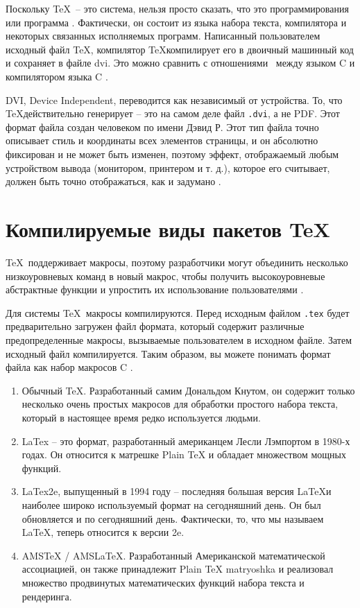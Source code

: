 Поскольку \TeX  \verb| |-- это система, нельзя просто сказать, что это  программирования\guillemotright \verb| | или \guillemotleft программа \guillemotright. Фактически, он состоит из языка набора текста, компилятора и некоторых связанных исполняемых программ. Написанный пользователем исходный файл \TeX, компилятор \TeX компилирует его в двоичный машинный код и сохраняет в файле dvi. Это можно сравнить с отношениями \  между языком C и компилятором языка C \cite{20}.

DVI, Device Independent, переводится как независимый от устройства. То, что \TeX действительно генерирует -- это на самом деле файл \verb|.dvi|, а не PDF. Этот формат файла создан человеком по имени Дэвид Р. Этот тип файла точно описывает стиль и координаты всех элементов страницы, и он абсолютно фиксирован и не может быть изменен, поэтому эффект, отображаемый любым устройством вывода (монитором, принтером и т. д.), которое его считывает, должен быть точно отображаться, как и задумано \cite{17}.

\section{Компилируемые виды пакетов \TeX}

\TeX \verb| |поддерживает макросы, поэтому разработчики могут объединить несколько низкоуровневых команд в новый макрос, чтобы получить высокоуровневые абстрактные функции и упростить их использование пользователями \cite{23}.

Для системы \TeX \verb| |макросы компилируются. Перед исходным файлом \verb|.tex| будет предварительно загружен файл формата, который содержит различные предопределенные макросы, вызываемые пользователем в исходном файле. Затем исходный файл компилируется. Таким образом, вы можете понимать формат файла как набор макросов C \cite{21}.

\begin{enumerate}
    \item  Обычный \TeX. Разработанный самим Дональдом Кнутом, он содержит только несколько очень простых макросов для обработки простого набора текста, который в настоящее время редко используется людьми.
    
    \item LaTex -- это формат, разработанный американцем Лесли Лэмпортом в 1980-х годах. Он относится к матрешке Plain TeX и обладает множеством мощных функций.
    
    \item LaTex2e, выпущенный в 1994 году -- последняя большая версия \LaTeX и наиболее широко используемый формат на сегодняшний день. Он был обновляется и по сегодняшний день. Фактически, то, что мы называем \guillemotleft LaTeX\guillemotright, теперь относится к версии 2e.
    
    \item AMSTeX / AMSLaTeX. Разработанный Американской математической ассоциацией, он также принадлежит Plain TeX matryoshka и реализовал множество продвинутых математических функций набора текста и рендеринга.
    
\end{enumerate}

